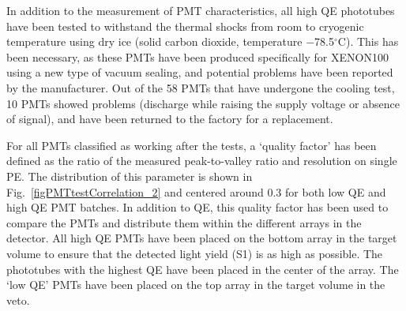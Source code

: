 In addition to the measurement of PMT characteristics, all high QE phototubes have been tested to withstand the thermal shocks from room to cryogenic temperature using dry ice (solid carbon dioxide, temperature $-$78.5$^{\circ}$C). This has been necessary, as these PMTs have been produced specifically for XENON100 using a new type of vacuum sealing, and potential problems have been reported by the manufacturer. Out of the 58 PMTs that have undergone the cooling test, 10 PMTs showed problems (discharge while raising the supply voltage or absence of signal), and have been returned to the factory for a replacement.

For all PMTs classified as working after the tests, a `quality factor' has been defined as the ratio of the measured peak-to-valley ratio and resolution on single PE. The distribution of this parameter is shown in Fig.~\ref{figPMTtestCorrelation_2} and centered around 0.3 for both low QE and high QE PMT batches. In addition to QE, this quality factor has been used to compare the PMTs and distribute them within the different arrays in the detector. All high QE PMTs have been placed on the bottom array in the target volume to ensure that the detected light yield (S1) is as high as possible. The phototubes with the highest QE have been placed in the center of the array. The `low QE' PMTs have been placed on the top array in the target volume in the veto.



